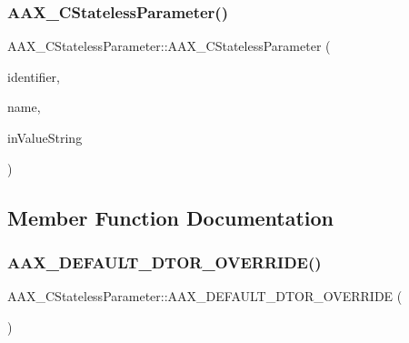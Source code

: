 \mbox{\label{a01541_a84bc019e769c5819095c0448c7bcb0c9}} 
\subsubsection{\texorpdfstring{AAX\_CStatelessParameter()}{AAX\_CStatelessParameter()}\hspace{0.1cm}{\footnotesize\ttfamily [2/2]}}
{\footnotesize\ttfamily A\+A\+X\+\_\+\+C\+Stateless\+Parameter\+::\+A\+A\+X\+\_\+\+C\+Stateless\+Parameter (\begin{DoxyParamCaption}\item[{const \mbox{\hyperlink{a01873}{A\+A\+X\+\_\+\+I\+String}} \&}]{identifier,  }\item[{const \mbox{\hyperlink{a01873}{A\+A\+X\+\_\+\+I\+String}} \&}]{name,  }\item[{const \mbox{\hyperlink{a01873}{A\+A\+X\+\_\+\+I\+String}} \&}]{in\+Value\+String }\end{DoxyParamCaption})\hspace{0.3cm}{\ttfamily [inline]}}



\subsection{Member Function Documentation}
\mbox{\label{a01541_af16bd3773904749a8db25d11221f2c42}} 
\subsubsection{\texorpdfstring{AAX\_DEFAULT\_DTOR\_OVERRIDE()}{AAX\_DEFAULT\_DTOR\_OVERRIDE()}}
{\footnotesize\ttfamily A\+A\+X\+\_\+\+C\+Stateless\+Parameter\+::\+A\+A\+X\+\_\+\+D\+E\+F\+A\+U\+L\+T\+\_\+\+D\+T\+O\+R\+\_\+\+O\+V\+E\+R\+R\+I\+DE (\begin{DoxyParamCaption}\item[{\mbox{\hyperlink{a01541}{A\+A\+X\+\_\+\+C\+Stateless\+Parameter}}}]{ }\end{DoxyParamCaption})}

